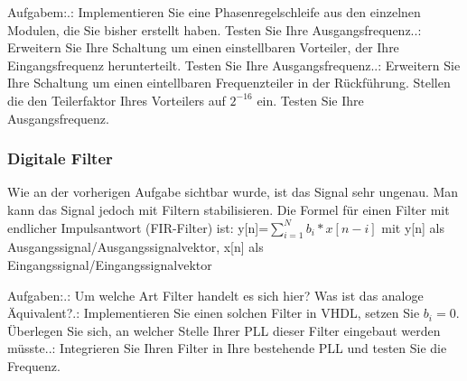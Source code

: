\documentclass{article}
\begin{document}
Aufgabem:.: Implementieren Sie eine Phasenregelschleife aus den einzelnen Modulen, die Sie bisher erstellt haben. Testen Sie Ihre Ausgangsfrequenz..: Erweitern Sie Ihre Schaltung um einen einstellbaren Vorteiler, der Ihre Eingangsfrequenz herunterteilt. Testen Sie Ihre Ausgangsfrequenz..: Erweitern Sie Ihre Schaltung um einen eintellbaren Frequenzteiler in der R\"uckf\"uhrung. Stellen die den Teilerfaktor Ihres Vorteilers auf $2^{-16}$ ein. Testen Sie Ihre Ausgangsfrequenz.

\subsubsection{Digitale Filter}
Wie an der vorherigen Aufgabe sichtbar wurde, ist das Signal sehr ungenau. Man kann das Signal jedoch mit Filtern stabilisieren. Die Formel f\"ur einen Filter mit endlicher Impulsantwort (FIR-Filter) ist:\newline
y[n]=\(\sum \limits_{i=1}^N b_ {i}*x[n-i] \) \newline
mit y[n] als Ausgangssignal/Ausgangssignalvektor, x[n] als Eingangssignal/Eingangssignalvektor \citep{DigitalFilter} \newline


Aufgaben:.: Um welche Art Filter handelt es sich hier? Was ist das analoge \"Aquivalent?.: Implementieren Sie einen solchen Filter in VHDL, setzen Sie $ b_{i}=0$. \"Uberlegen Sie sich, an welcher Stelle Ihrer PLL dieser Filter eingebaut werden m\"usste..: Integrieren Sie Ihren Filter in Ihre bestehende PLL und testen Sie die Frequenz.
\end{document}
